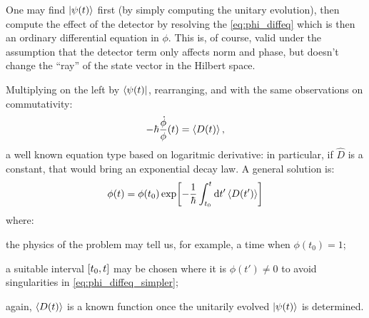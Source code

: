 One may find $\ket{\psi(t)}$ first (by simply computing the unitary evolution),
then compute the effect of the detector by resolving the \eqref{eq:phi_diffeq}
which is then an ordinary differential equation in $\phi$. This is, of course, valid
under the assumption that the detector term only affects norm and phase,
but doesn't change the ``ray'' of the state vector in the Hilbert space. 

Multiplying on the left by $\bra{\psi(t)}$, rearranging, and with the same observations
on commutativity:
\begin{equation}\label{eq:phi_diffeq_simpler}
  -\hbar\frac{\dot{\phi}}{\phi}(t) = \ev{D(t)} \text{,}
\end{equation}
a well known equation type based on logaritmic derivative: in particular,
if $\hat{D}$ is a constant, that would bring an exponential decay law.
A general solution is:
\begin{equation}
  \phi(t) = \phi(t_0) \exp[ -\frac{1}{\hbar} \int_{t_0}^{t} \dd{t'} \ev{D(t')} ]
\end{equation}
where:
\begin{enumerate*}[label=\emph{\alph*})]
  \item
    the physics of the problem may tell us, for example, a time when $\phi(t_0) = 1$;
  \item
    a suitable interval $\qty[t_0, t]$ may be chosen where it is $\phi(t') \ne 0$
    to avoid singularities in \eqref{eq:phi_diffeq_simpler};
  \item
    again, $\ev{D(t)}$ is a known function
    once the unitarily evolved $\ket{\psi(t)}$ is determined.
\end{enumerate*}


   